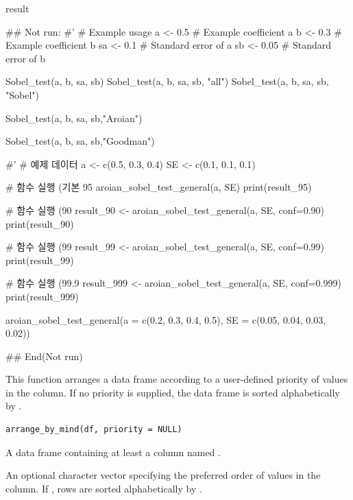 \documentclass[a4paper]{book}
\begin{document}
%
\begin{Value}
result
\end{Value}
%
\begin{Examples}
\begin{ExampleCode}

\#\# Not run: 
#'
# Example usage
a <- 0.5  # Example coefficient a
b <- 0.3  # Example coefficient b
sa <- 0.1 # Standard error of a
sb <- 0.05 # Standard error of b

Sobel_test(a, b, sa, sb)
Sobel_test(a, b, sa, sb, "all")
Sobel_test(a, b, sa, sb, "Sobel")

Sobel_test(a, b, sa, sb,"Aroian")

Sobel_test(a, b, sa, sb,"Goodman")

#'
# 예제 데이터
a <- c(0.5, 0.3, 0.4)
SE <- c(0.1, 0.1, 0.1)

# 함수 실행 (기본 95%
aroian_sobel_test_general(a, SE)
print(result_95)

# 함수 실행 (90%
result_90 <- aroian_sobel_test_general(a, SE, conf=0.90)
print(result_90)

# 함수 실행 (99%
result_99 <- aroian_sobel_test_general(a, SE, conf=0.99)
print(result_99)

# 함수 실행 (99.9%
result_999 <- aroian_sobel_test_general(a, SE, conf=0.999)
print(result_999)


aroian_sobel_test_general(a = c(0.2, 0.3, 0.4, 0.5),
                          SE = c(0.05, 0.04, 0.03, 0.02))%


## End(Not run)
\end{ExampleCode}
\end{Examples}
%
\begin{Description}
This function arranges a data frame according to a user-defined
priority of values in the  column. If no priority is supplied,
the data frame is sorted alphabetically by .
\end{Description}
%
\begin{Usage}
\begin{verbatim}
arrange_by_mind(df, priority = NULL)
\end{verbatim}
\end{Usage}
%
\begin{Arguments}
\begin{ldescription}
\item[\code{df}] A data frame containing at least a column named .

\item[\code{priority}] An optional character vector specifying the preferred
order of values in the  column. If , rows are
sorted alphabetically by .
\end{ldescription}
\end{Arguments}
\end{document}
